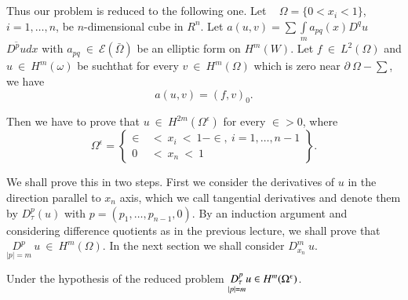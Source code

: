 \subsection{}\label{lec15:sec9:subsec2} %

\begin{step}\label{lec15:sec9:subsec2:step2}%
  Thus our problem is reduced to the following one. Let ~ $\Omega =
  \big\{  0  <  x_i  <  1\big\}$, $i = 1, \ldots, n$, be $n$-dimensional
  cube in $R^n$. Let $a(u,v) = \sum \int\limits_{m} a_{pq} (x)  D^q u$ 
  $\overline{D^p u} dx$ with $a_{pq} ~ \in ~ \mathscr{E}
  (\bar{\Omega})$ be an elliptic form on $H^m(W)$. Let $f ~
  \in ~ L^2 (\Omega)$ and $u ~ \in ~ H^m(\omega)$ be
  such\pageoriginale that for every $v ~ \in ~ H^m(\Omega)$ which is zero near
  $\partial ~ \Omega - \sum$, we have  
  \begin{equation}
    a(u,v) = (f,v)_0.\tag{1}\label{lec15:sec9:subsec2:eq1}
  \end{equation}
\end{step}

Then we have to prove that $u ~ \in ~
H^{2m}(\Omega^\epsilon)$ for every $\in > 0$, where  
\begin{equation*}
\Omega^\epsilon = \left\{
   \begin{aligned}
     \in ~ & < ~ x_i ~ < ~ 1 - \in , ~ i = 1, \ldots , n-1\\
     0 ~ & < ~ x_n ~ < ~ 1
   \end{aligned}
\right \}.
\end{equation*}

We shall prove this in two steps.  First we consider the derivatives
of $u$ in the direction parallel to $x_n$ axis, which we call
tangential derivatives and denote them by $D^{p}_\tau(u)$ with $p =
(p_1,\ldots,p_{n-1},0)$. By an induction argument and considering
difference quotients as in the previous lecture, we shall prove that
$\underset{|p|=m}{D^p} ~ u ~ \in ~ H^m(\Omega)$. In the next
section we shall consider $D^m_{x_n} ~ u$. 

\begin{proposition}\label{lec15:sec9:subsec2:prop9.1}%
  Under the hypothesis of the reduced problem $\underset{|p|=m}{D_\tau^p} u  \in\break 
  H^m(\Omega^\epsilon)$. 
\end{proposition}

